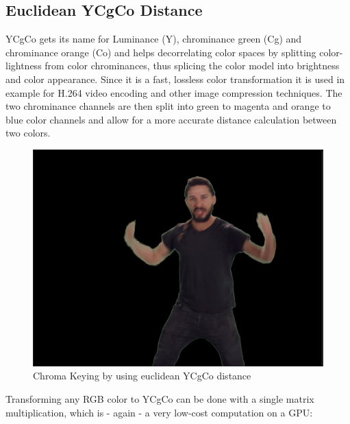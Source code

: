 \subsection{Euclidean YCgCo Distance}

YCgCo gets its name for Luminance (Y), chrominance green (Cg) and chrominance 
orange (Co) and helps decorrelating color spaces by splitting color-lightness 
from color chrominances, thus splicing the color model into brightness and 
color appearance. Since it is a fast, lossless color transformation it 
is used in example for H.264 video encoding and other image compression 
techniques. The two chrominance channels are then split into green to magenta 
and orange to blue color channels and allow for a more accurate distance 
calculation between two colors.

\begin{figure}[htb]
	\includegraphics[width=\textwidth]{_raw_resources/Comparison_YCgCo_color.png}
	\caption{Chroma Keying by using euclidean YCgCo distance}
	\label{fig:chroma:euclidean:ycgco}
\end{figure}

Transforming any RGB color to YCgCo can be done with a single matrix  
multiplication, which is - again - a very low-cost computation on a GPU:


